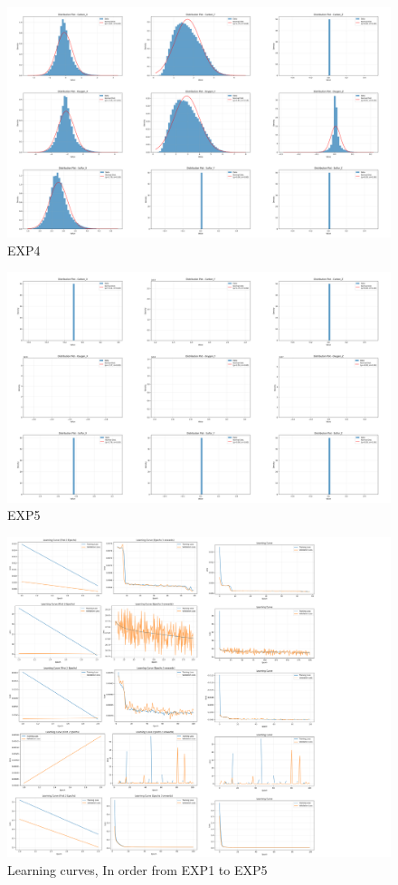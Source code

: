 \documentclass{article}
\begin{document}
\begin{figure}[H]
   \centering
   \includegraphics[width=1.2\textwidth]{EXP4.png}
   \caption{EXP4}
\end{figure}

\begin{figure}[H]
   \centering
   \includegraphics[width=1.2\textwidth]{EXP5.png}
   \caption{EXP5}
\end{figure}

\begin{figure}[H]
   \centering
   \includegraphics[width=1.4\textwidth]{LC.png}
   \caption{Learning curves, In order from EXP1 to EXP5}
\end{figure}
\end{document}
